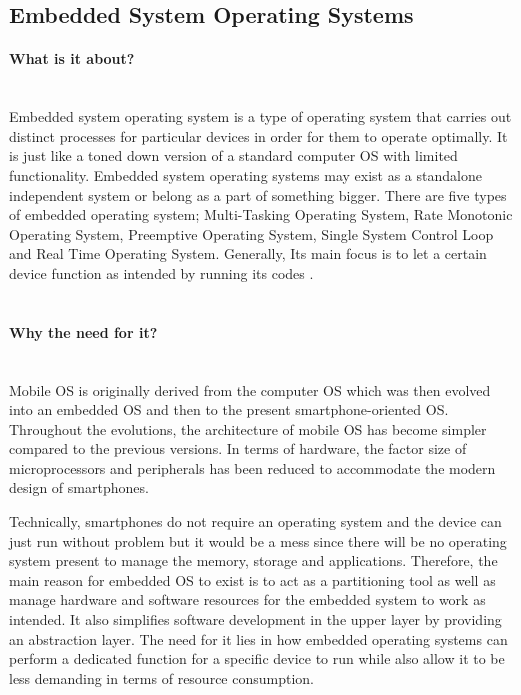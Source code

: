 \documentclass[conference]{IEEEtran}
\newcommand{\forceindent}{\leavevmode{\parindent=1em\indent}}
\begin{document}
\subsection{Embedded System Operating Systems}

\paragraph{What is it about?}\mbox{} \\
\forceindent Embedded system operating system is a type of operating system that carries out distinct processes for particular devices in order for them to operate optimally. It is just like a toned down version of a standard computer OS with limited functionality\cite{TNEOS}.
Embedded system operating systems may exist as a standalone independent system or belong as a part of something bigger. There are five types of embedded operating system; Multi-Tasking Operating System, Rate Monotonic Operating System, Preemptive Operating System, Single System Control Loop and Real Time Operating System. Generally, Its main focus is to let a certain device function as intended by running its codes
\cite{ITEOSMC}. \\

\\
\paragraph{Why the need for it?}\mbox{} \\
\forceindent Mobile OS is originally derived from the computer OS which was then evolved into an embedded OS and then to the present smartphone-oriented OS. Throughout the evolutions, the architecture of mobile OS has become simpler compared to the previous versions. In terms of hardware, the factor size of microprocessors and peripherals has been reduced to accommodate the modern design of smartphones.

\smallskip
\forceindent Technically, smartphones do not require an operating system and the device can just run without problem but it would be a mess since there will be no operating system present to manage the memory, storage and applications. Therefore, the main reason for embedded OS to exist is to act as a partitioning tool as well as manage hardware and software resources for the embedded system to work as intended. It also simplifies software development in the upper layer by providing an abstraction layer. The need for it lies in how embedded operating systems can perform a dedicated function for a specific device to run while also allow it to be less demanding in terms of resource consumption\cite{ITEOSPV}.
\\
\medskip
\end{document}
